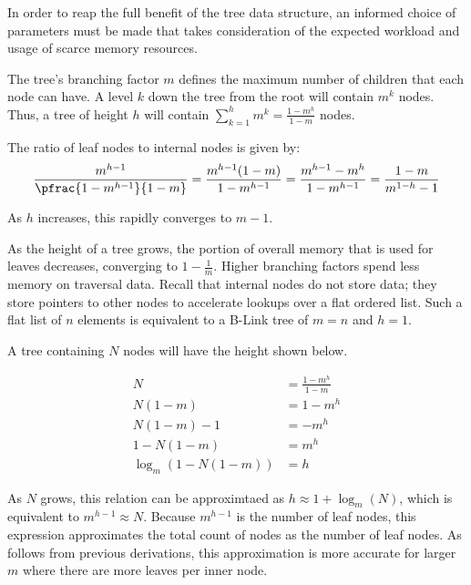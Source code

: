 

In order to reap the full benefit of the tree data structure, an informed choice
of parameters must be made that takes consideration of the expected workload and
usage of scarce memory resources.

The tree's branching factor $m$ defines the maximum number of children that each
node can have. A level $k$ down the tree from the root will contain $m^k$ nodes.
Thus, a tree of height $h$ will contain
$\sum_{k=1}^h m^k = \frac{1-m^h}{1-m}$ nodes.

The ratio of leaf nodes to internal nodes is given by:
$$
	\frac{m^{h-1}}{\pfrac{1-m^{h-1}}{1-m}}
	= \frac{m^{h-1}(1-m)}{1-m^{h-1}}
	= \frac{m^{h-1}-m^{h}}{1-m^{h-1}}
	= \frac{1-m}{m^{1-h} - 1}
$$

As $h$ increases, this rapidly converges to $m-1$.

\begin{figure}[H]
	\centering
	
\end{figure}

As the height of a tree grows, the portion of overall memory that is used for
leaves decreases, converging to $1-\frac{1}{m}$. Higher branching factors spend
less memory on traversal data. Recall that internal nodes do not store data;
they store pointers to other nodes to accelerate lookups over a flat ordered
list. Such a flat list of $n$ elements is equivalent to a B-Link tree of $m=n$
and $h=1$.

\begin{figure}[H]
	\centering
	
\end{figure}

A tree containing $N$ nodes will have the height shown below.

\begin{align*}
	N &= \frac{1-m^h}{1-m} \\
	N (1-m) &= 1-m^h \\
	N (1-m) - 1 &= -m^h \\
	1 - N (1-m) &= m^h \\
	\log_m\left(1 - N (1-m)\right) &= h
\end{align*}

As $N$ grows, this relation can be approximtaed as $h \approx 1 + \log_m(N)$,
which is equivalent to  $m^{h-1} \approx N$. Because $m^{h-1}$ is the number of
leaf nodes, this expression approximates the total count of nodes as the number
of leaf nodes. As follows from previous derivations, this approximation is more
accurate for larger $m$ where there are more leaves per inner node.

